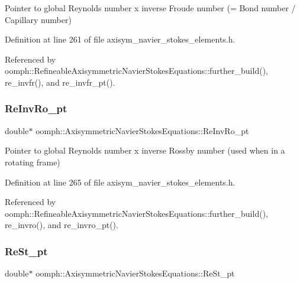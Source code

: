 Pointer to global Reynolds number x inverse Froude number (= Bond number / Capillary number) 



Definition at line 261 of file axisym\+\_\+navier\+\_\+stokes\+\_\+elements.\+h.



Referenced by oomph\+::\+Refineable\+Axisymmetric\+Navier\+Stokes\+Equations\+::further\+\_\+build(), re\+\_\+invfr(), and re\+\_\+invfr\+\_\+pt().

\mbox{\label{classoomph_1_1AxisymmetricNavierStokesEquations_ac010dc41fcd5c882e820e1888d157d7f}} 
\subsubsection{\texorpdfstring{Re\+Inv\+Ro\+\_\+pt}{ReInvRo\_pt}}
{\footnotesize\ttfamily double$\ast$ oomph\+::\+Axisymmetric\+Navier\+Stokes\+Equations\+::\+Re\+Inv\+Ro\+\_\+pt\hspace{0.3cm}{\ttfamily [protected]}}



Pointer to global Reynolds number x inverse Rossby number (used when in a rotating frame) 



Definition at line 265 of file axisym\+\_\+navier\+\_\+stokes\+\_\+elements.\+h.



Referenced by oomph\+::\+Refineable\+Axisymmetric\+Navier\+Stokes\+Equations\+::further\+\_\+build(), re\+\_\+invro(), and re\+\_\+invro\+\_\+pt().

\mbox{\label{classoomph_1_1AxisymmetricNavierStokesEquations_a7219a5382596279026ef665be7e47569}} 
\subsubsection{\texorpdfstring{Re\+St\+\_\+pt}{ReSt\_pt}}
{\footnotesize\ttfamily double$\ast$ oomph\+::\+Axisymmetric\+Navier\+Stokes\+Equations\+::\+Re\+St\+\_\+pt\hspace{0.3cm}{\ttfamily [protected]}}



